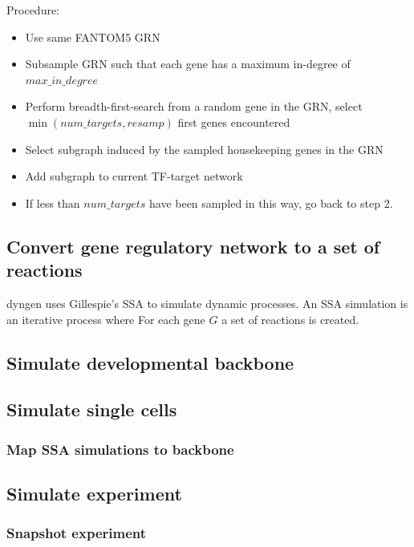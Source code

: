 Procedure:
\begin{itemize}
	\item Use same FANTOM5 GRN
	\item Subsample GRN such that each gene has a maximum in-degree of $max\_in\_degree$
	\item Perform breadth-first-search from a random gene in the GRN, select $\min(num\_targets, resamp)$ first genes encountered
	\item Select subgraph induced by the sampled housekeeping genes in the GRN
	\item Add subgraph to current TF-target network
	\item If less than $num\_targets$ have been sampled in this way, go back to step 2.
\end{itemize}

\subsection{Convert gene regulatory network to a set of reactions}
dyngen uses Gillespie's SSA to simulate dynamic processes. An SSA simulation is an iterative process where 
For each gene $G$ a set of reactions is created.

\subsection{Simulate developmental backbone} \label{sec:dyngen_sim_backbone}
\blindtext

\subsection{Simulate single cells} \label{sec:dyngen_ssa}
\blindtext

\subsubsection{Map SSA simulations to backbone}
\blindtext

\subsection{Simulate experiment}
\blindtext

\subsubsection{Snapshot experiment}
\blindtext

